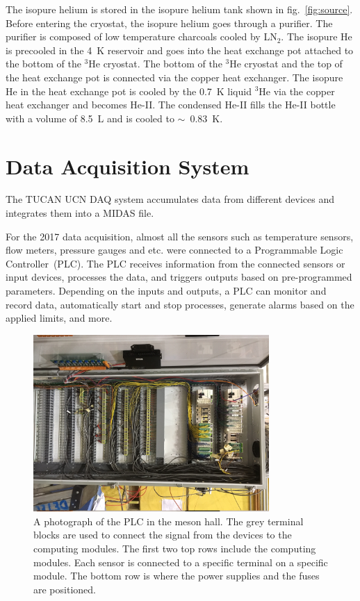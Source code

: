 The isopure helium is stored in the isopure helium tank shown in
fig.~\ref{fig:source}. Before entering the cryostat, the isopure
helium goes through a purifier. The purifier is composed of low
temperature charcoals cooled by LN$_2$.  The isopure He is precooled
in the 4~K reservoir and goes into the heat exchange pot attached to
the bottom of the $^3$He cryostat. The bottom of the $^3$He cryostat
and the top of the heat exchange pot is connected via the copper heat
exchanger. The isopure He in the heat exchange pot is cooled by the
0.7~K liquid $^3$He via the copper heat exchanger and becomes
He-II. The condensed He-II fills the He-II bottle with a volume of
8.5~L and is cooled to $\sim$~0.83~K.




\section{Data Acquisition System\label{sec:DAQ}}
The TUCAN UCN DAQ system accumulates data from different devices and
integrates them into a MIDAS file.

For the 2017 data acquisition, almost all the sensors such as
temperature sensors, flow meters, pressure gauges and etc. were
connected to a Programmable Logic Controller~(PLC). The PLC receives
information from the connected sensors or input devices, processes the
data, and triggers outputs based on pre-programmed parameters.
Depending on the inputs and outputs, a PLC can monitor and record
data, automatically start and stop processes, generate alarms based on
the applied limits, and more.

\begin{figure}[h!]
  \centering
  \includegraphics[width=0.8\textwidth, angle = 90]{PLC.JPG}
  \caption[TUCAN's PLC in the meson hall]{A photograph of the PLC in
    the meson hall. The grey terminal blocks are used to connect the
    signal from the devices to the computing modules. The first two
    top rows include the computing modules. Each sensor is connected
    to a specific terminal on a specific module. The bottom row is
    where the power supplies and the fuses are positioned. }
  \label{fig:PLC}
\end{figure}

